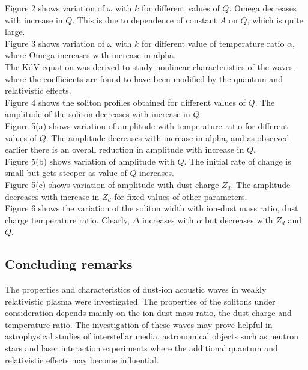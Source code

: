 \documentclass[journal]{IEEEtran}
\begin{document}
		Figure 2 shows variation of $\omega$ with $k$ for different values of $Q$. Omega decreases with increase in $Q$. This is due to dependence of constant $A$ on $Q$, which is quite large.\\

		Figure 3 shows variation of $\omega$ with $k$ for different value of temperature ratio $\alpha$, where Omega increases with increase in alpha. \\
		
		The KdV equation was derived to study nonlinear characteristics of the waves, where the coefficients are found to have been modified by the quantum and relativistic effects.\\
		
		Figure 4 shows the soliton profiles obtained for different values of $Q$. The amplitude of the soliton decreases with increase in $Q$.\\
		
		Figure 5(a) shows variation of amplitude with temperature ratio for different values of $Q$. The amplitude decreases with increase in alpha, and as observed earlier there is an overall reduction in amplitude with increase in $Q$.\\
		
		Figure 5(b) shows variation of amplitude with $Q$. The initial rate of change is small but gets steeper as value of $Q$ increases.\\
		
		Figure 5(c) shows variation of amplitude with dust charge $Z_d$. The amplitude decreases with increase in $Z_d$ for fixed values of other parameters.\\

		Figure 6 shows the variation of the soliton width with ion-dust mass ratio, dust charge temperature ratio. Clearly, $\Delta$ increases with $\alpha$ but decreases with $Z_d$ and $Q$.

\subsection{Concluding remarks}

The properties and characteristics of dust-ion acoustic waves in weakly relativistic plasma were investigated. The properties of the solitons under consideration depends mainly on the ion-dust mass ratio, the dust charge and temperature ratio. The investigation of these waves may prove helpful in astrophysical studies of interstellar media, astronomical objects such as neutron stars and laser interaction experiments where the additional quantum and relativistic effects may become influential.
\end{document}
